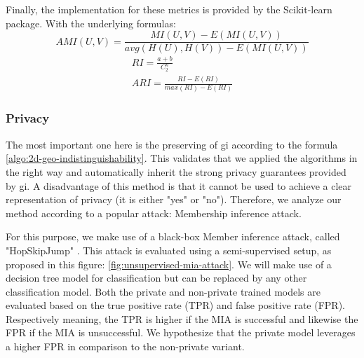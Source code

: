 Finally, the implementation for these metrics is provided by the Scikit-learn package.
With the underlying formulas:
\begin{equation}
  AMI(U, V) = \frac{MI(U, V) - E(MI(U, V))}{avg(H(U), H(V)) - E(MI(U, V))}
\end{equation}
\begin{gather}
  RI = \frac{a + b}{C^{n}_{2}} \\
  ARI = \frac{RI - E(RI)}{max(RI) - E(RI)}
\end{gather}


\subsubsection{Privacy}
The most important one here is the preserving of \gls{gi} according to the formula \ref{algo:2d-geo-indistinguishability}.
This validates that we applied the algorithms in the right way and automatically inherit the strong privacy guarantees provided by \gls{gi}.
A disadvantage of this method is that it cannot be used to achieve a clear representation of privacy (it is either "yes" or "no").
Therefore, we analyze our method according to a popular attack: Membership inference attack.

For this purpose, we make use of a black-box Member inference attack, called "HopSkipJump" \citep{chen_hopskipjumpattack_2020,li_membership_2021}.
This attack is evaluated using a semi-supervised setup, as proposed in this figure: \ref{fig:unsupervised-mia-attack}.
We will make use of a decision tree model for classification but can be replaced by any other classification model.
Both the private and non-private trained models are evaluated based on the true positive rate (TPR) and false positive rate (FPR).
Respectively meaning, the TPR is higher if the MIA is successful and likewise the FPR if the MIA is unsuccessful.
We hypothesize that the private model leverages a higher FPR in comparison to the non-private variant.

